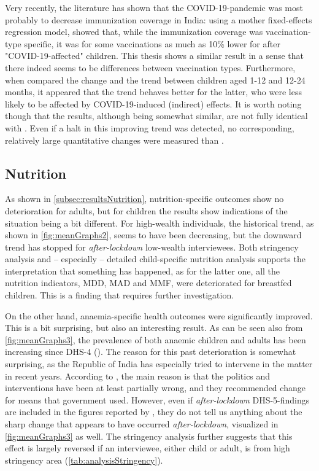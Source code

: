 \documentclass[12pt,a4paper,notitlepage]{article}
\begin{document}
Very recently, the literature has shown that the COVID-19-pandemic was most probably to decrease immunization coverage in India: using a mother fixed-effects regression model, \citet{Summan:2023} showed that, while the immunization coverage was vaccination-type specific, it was for some vaccinations as much as 10\% lower for after "COVID-19-affected" children. This thesis shows a similar result in a sense that there indeed seems to be differences between vaccination types. Furthermore, when compared the change and the trend between children aged 1-12 and 12-24 months, it appeared that the trend behaves better for the latter, who were less likely to be affected by COVID-19-induced (indirect) effects. It is worth noting though that the results, although being somewhat similar, are not fully identical with \citet{Summan:2023}. Even if a halt in this improving trend was detected, no corresponding, relatively large quantitative changes were measured than \citet{Summan:2023}.

\subsection{Nutrition} \label{subsec:discussionNutrition}

As shown in \cref{subsec:resultsNutrition}, nutrition-specific outcomes show no deterioration for adults, but for children the results show indications of the situation being a bit different. For high-wealth individuals, the historical trend, as shown in \cref{fig:meanGraphs2}, seems to have been decreasing, but the downward trend has stopped for \textit{after-lockdown} low-wealth interviewees. Both stringency analysis and -- especially -- detailed child-specific nutrition analysis supports the interpretation that something has happened, as for the latter one, all the nutrition indicators, MDD, MAD and MMF, were deteriorated for breastfed children. This is a finding that requires further investigation.

On the other hand, anaemia-specific health outcomes were significantly improved. This is a bit surprising, but also an interesting result. As can be seen also from \cref{fig:meanGraphs3}, the prevalence of both anaemic children and adults has been increasing since DHS-4 (\citet{Rai:2023}). The reason for this past deterioration is somewhat surprising, as the Republic of India has especially tried to intervene in the matter in recent years. According to \citet{Rai:2023}, the main reason is that the politics and interventions have been at least partially wrong, and they recommended change for means that government used. However, even if \textit{after-lockdown} DHS-5-findings are included in the figures reported by \citet{Rai:2023}, they do not tell us anything about the sharp change that appears to have occurred \textit{after-lockdown}, visualized in \cref{fig:meanGraphs3} as well.  The stringency analysis further suggests that this effect is largely reversed if an interviewee, either child or adult, is from high stringency area (\cref{tab:analysisStringency}).
\end{document}

